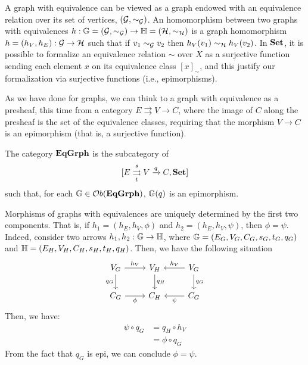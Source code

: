 \begin{remark}\label{rem:eqgrph_set_eq}
     A graph with equivalence can be viewed as a graph endowed with an equivalence relation over its set of vertices, $(\mathcal{G}, \sim_{\mathcal{G}})$. An homomorphism between two graphs with equivalences $h :\mathbb{G} = (\mathcal{G}, \sim_{\mathcal{G}})\rightarrow \mathbb{H} = (\mathcal{H}, \sim_{\mathcal{H}})$ is a graph homomorphism $h = (h_V, h_E):\mathcal{G} \rightarrow \mathcal{H}$ such that if $v_1 \sim_{\mathcal{G}} v_2$ then $h_V(v_1) \sim_{\mathcal{H}} h_V(v_2)$. In $\mathbf{Set}$, it is possible to formalize an equivalence relation $\sim$ over $X$ as a surjective function sending each element $x$ on its equivalence class $[x]_{\sim}$, and this justify our formalization via surjective functions (i.e., epimorphisms).
\end{remark}

As we have done for graphs, we can think to a graph with equivalence as a presheaf, this time from a category $E \rightrightarrows V \rightarrow C$, where the image of $C$ along the presheaf is the set of the equivalence classes, requiring that the morphism $V\rightarrow C$ is an epimorphism (that is, a surjective function).

\begin{definition}\label{def:eq_grphs}
    The category $\mathbf{EqGrph}$ is the subcategory of $$[E \mathrel{\mathop{\rightrightarrows}^{s}_{t}} V \xrightarrow{q} C, \mathbf{Set}]$$ such that, for each $\mathbb{G} \in \mathcal{O}b(\mathbf{EqGrph})$, $\mathbb{G}(q)$ is an epimorphism. 
\end{definition}

\begin{obs}\label{obs:eq_grph_morph_det_by_first_two_comp}
    Morphisms of graphs with equivalences are uniquely determined by the first two components. That is, if $h_1 = (h_E, h_V, \phi)$ and $h_2 = (h_E, h_V, \psi)$, then $\phi = \psi$. Indeed, consider two arrows $h_1, h_2 : \mathbb{G \to H}$, where $\mathbb{G} = (E_G, V_G, C_G, s_G, t_G, q_G)$ and $\mathbb{H} = (E_H, V_H, C_H, s_H, t_H, q_H)$. Then, we have the following situation
    \[
        \begin{tikzcd}
            V_G \arrow[r, "{h_V}"] \arrow[d, "{q_G}"swap] & V_H \arrow[d, "{q_H}"] & V_G \arrow[l, "{h_V}"swap] \arrow[d, "{q_G}"] \\
            C_G \arrow[r, "{\phi}"swap] & C_H & \arrow[l, "{\psi}"] C_G
        \end{tikzcd}
     \]
     Then, we have:
     \begin{align*}
         \psi \circ q_G &= q_H \circ h_V \\
                        &= \phi \circ q_G
     \end{align*}
     From the fact that $q_G$ is epi, we can conclude $\phi = \psi$.
\end{obs}

